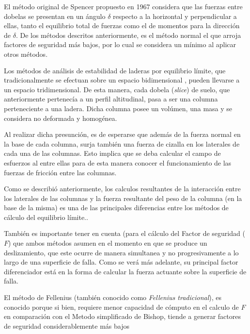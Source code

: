 El m\'etodo original de Spencer propuesto en 1967 considera que las fuerzas entre dobelas se presentan en un \'angulo $\delta$ respecto a la horizontal y perpendicular a ellas, tanto el equilibrio total de fuerzas como el de momentos para la direcci\'on de $\delta$. De los m\'etodos descritos anteriormente, es el m\'etodo normal el que arroja factores de seguridad m\'as bajos, por lo cual se considera un m\'inimo al aplicar otros m\'etodos.

Los m\'etodos de an\'alisis de estabilidad de laderas por equilibrio l\'imite, que tradicionalmente se efectuan sobre un espacio bidimensional \cite{fredlund1977comparison} , pueden llevarse a un espacio tridimensional. 
De esta manera, cada dobela (\textit{slice}) de suelo, que anteriormente pertenec\'ia a un perfil altitudinal, pasa a ser una columna perteneciente a una ladera. Dicha columna posee un vol\'umen, una masa y se considera no deformada y homog\'enea.

Al realizar dicha presunci\'on, es de esperarse que adem\'as de la fuerza normal en la base de cada columna, surja tambi\'en  una fuerza de cizalla en los laterales de cada una de las columnas. Esto implica que se deba calcular el campo de esfuerzos al entre ellas para de esta manera conocer el funcionamiento de las fuerzas de fricci\'on entre las columnas.\cite{reid2015scoops3d}

Como se describi\'o anteriormente, los calculos resultantes de la interacci\'on entre los laterales de las columnas y la fuerza resultante del peso de la columna (en la base de la misma) es una de las principales diferencias entre los m\'etodos de c\'alculo del equilibrio l\'imite..

Tambi\'en es importante tener en cuenta (para el c\'alculo del Factor de seguridad (\(F\)) que ambos m\'etodos asumen en el momento en que se produce un deslizamiento, que este ocurre de manera simultanea y no progresivamente a lo largo de una superficie de falla. Como se ver\'a m\'as adelante, su principal factor diferenciador est\'a en la forma de calcular la fuerza actuante sobre la superficie de falla.

El m\'etodo de Fellenius (tambi\'en conocido como  \emph{Fellenius tradicional}), es conocido porque si bien, requiere menor capacidad de c\'omputo en el calculo de \(F\) en comparaci\'on con el Metodo simplificado de Bishop, tiende a generar factores de seguridad considerablemente m\'as bajos \cite{traditional}
